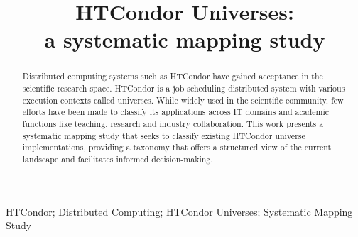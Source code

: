 \documentclass[]{interact}
\theoremstyle{plain}%
\theoremstyle{definition}
\theoremstyle{remark}
\begin{document}

\title{
	HTCondor Universes:\\
	a systematic mapping study
}


\author{
}

\maketitle

\begin{abstract}
	Distributed computing systems such as HTCondor have gained acceptance in the scientific research space. HTCondor is a job scheduling distributed system with various execution contexts called universes. While widely used in the scientific community, few efforts have been made to classify its applications across IT domains and academic functions like teaching, research and industry collaboration. This work presents a systematic mapping study that seeks to classify existing HTCondor universe implementations, providing a taxonomy that offers a structured view of the current landscape and facilitates informed decision-making.
\end{abstract}

\begin{keywords}
	HTCondor; Distributed Computing; HTCondor Universes; Systematic Mapping Study
\end{keywords}










\end{document}
